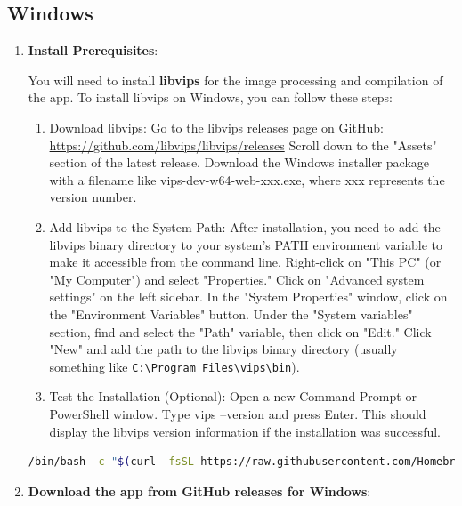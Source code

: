 \documentclass[11pt,a4paper]{article}
\begin{document}
\subsection*{Windows}


\begin{enumerate}[label*=\arabic*.]
	\item[\textbullet] {\bf Install Prerequisites}: 

	You will need to install \textbf{libvips} for the image processing and compilation of the app.
	To install libvips on Windows, you can follow these steps:
\begin{enumerate}[label*=\arabic*.]
    \item[\textbullet]{Download libvips:}
	Go to the libvips releases page on GitHub: \url{https://github.com/libvips/libvips/releases}
        Scroll down to the "Assets" section of the latest release.
        Download the Windows installer package with a filename like vips-dev-w64-web-xxx.exe, where xxx represents the version number.
    \item[\textbullet]{Add libvips to the System Path:}
        After installation, you need to add the libvips binary directory to your system's PATH environment variable to make it accessible from the command line.
        Right-click on "This PC" (or "My Computer") and select "Properties."
        Click on "Advanced system settings" on the left sidebar.
        In the "System Properties" window, click on the "Environment Variables" button.
        Under the "System variables" section, find and select the "Path" variable, then click on "Edit."
        Click "New" and add the path to the libvips binary directory (usually something like \texttt{C:\textbackslash Program Files\textbackslash vips\textbackslash bin}).

    \item[\textbullet]{Test the Installation (Optional):}
        Open a new Command Prompt or PowerShell window.
        Type vips --version and press Enter. This should display the libvips version information if the installation was successful.
	\end{enumerate}

	\begin{lstlisting}[language=sh]
		 /bin/bash -c "$(curl -fsSL https://raw.githubusercontent.com/Homebrew/install/HEAD/install.sh)"
	\end{lstlisting}


	\item[\textbullet] {\bf Download the app from GitHub releases for Windows}: 


\end{enumerate}
\end{document}
